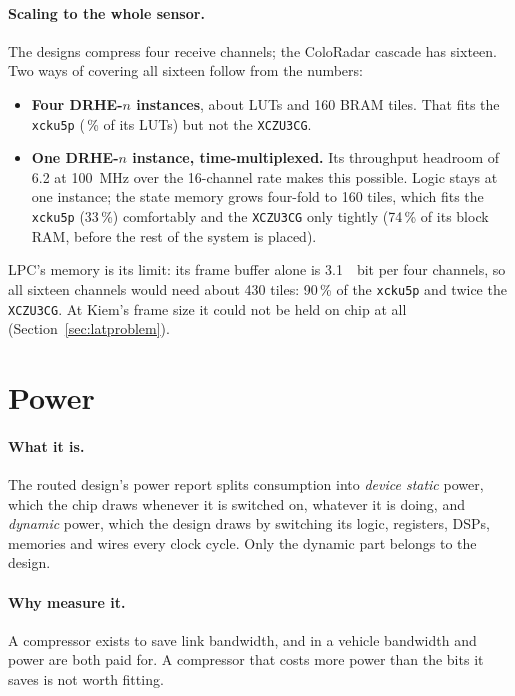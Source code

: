 \paragraph{Scaling to the whole sensor.} The designs compress four receive
channels; the ColoRadar cascade has sixteen. Two ways of covering all sixteen
follow from the numbers:
\begin{itemize}
\item \textbf{Four DRHE-$n$ instances}, about  LUTs and 160
BRAM tiles. That fits the \texttt{xcku5p} (\,\% of its
LUTs) but not the \texttt{XCZU3CG}.
\item \textbf{One DRHE-$n$ instance, time-multiplexed.} Its throughput headroom
of 6.2 at \SI{100}{\mega\hertz} over the 16-channel rate makes this possible.
Logic stays at one instance; the state memory grows four-fold to 160 tiles,
which fits the \texttt{xcku5p} (33\,\%) comfortably and the \texttt{XCZU3CG}
only tightly (74\,\% of its block RAM, before the rest of the system is
placed).
\end{itemize}
LPC's memory is its limit: its frame buffer alone is \SI{3.1}{\mebi bit} per
four channels, so all sixteen channels would need about 430 tiles: 90\,\% of
the \texttt{xcku5p} and twice the \texttt{XCZU3CG}. At Kiem's frame size it
could not be held on chip at all
(Section~\ref{sec:latproblem}).

\section{Power}
\label{sec:power}

\paragraph{What it is.} The routed design's power report splits consumption into
\emph{device static} power, which the chip draws whenever it is switched on,
whatever it is doing, and \emph{dynamic} power, which the design draws by
switching its logic, registers, DSPs, memories and wires every clock cycle.
Only the dynamic part belongs to the design.

\paragraph{Why measure it.} A compressor exists to save link bandwidth, and in
a vehicle bandwidth and power are both paid for. A compressor that costs more
power than the bits it saves is not worth fitting.

